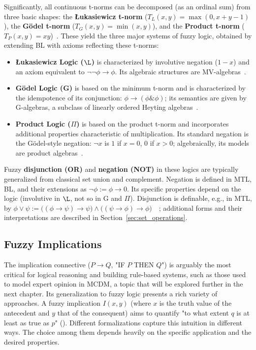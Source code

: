 Significantly, all continuous t-norms can be decomposed (as an ordinal sum) from three basic shapes: the \textbf{Łukasiewicz t-norm} ($T_L(x, y) = \max(0, x+y-1)$), the \textbf{Gödel t-norm} ($T_G(x, y) = \min(x, y)$), and the \textbf{Product t-norm} ($T_P(x, y) = x y$)~\cite[Thm. 2.1.16]{Hajek1998}. These yield the three major systems of fuzzy logic, obtained by extending BL with axioms reflecting these t-norms:
\begin{itemize}
    \item \textbf{Łukasiewicz Logic ($\L$)} is characterized by involutive negation ($1-x$) and an axiom equivalent to $\lnot\lnot\phi \rightarrow \phi$. Its algebraic structures are MV-algebras~\cite[Ch. 3]{Hajek1998}.
    \item \textbf{Gödel Logic (G)} is based on the minimum t-norm and is characterized by the idempotence of its conjunction: $\phi \rightarrow (\phi \& \phi)$; its semantics are given by G-algebras, a subclass of linearly ordered Heyting algebras~\cite[Sec. 4.2]{Hajek1998}.
    \item \textbf{Product Logic ($\Pi$)} is based on the product t-norm and incorporates additional properties characteristic of multiplication. Its standard negation is the Gödel-style negation: $\lnot x$ is $1$ if $x=0$, $0$ if $x>0$; algebraically, its models are product algebras~\cite[Sec. 4.1]{Hajek1998}.
\end{itemize}

Fuzzy \textbf{disjunction (OR)} and \textbf{negation (NOT)} in these logics are typically generalized from classical set union and complement. Negation is defined in MTL, BL, and their extensions as $\lnot \phi := \phi \rightarrow 0$. Its specific properties depend on the logic (involutive in $\L$, not so in G and $\Pi$). Disjunction is definable, e.g., in MTL, by $\phi \vee \psi := \big((\phi \rightarrow \psi) \rightarrow \psi\big) \wedge \big((\psi \rightarrow \phi) \rightarrow \phi\big)$~\cite[Def. 1]{GodoMonoidal}~\cite[Def. 2.2.1]{Hajek1998}; additional forms and their interpretations are described in Section~\ref{sec:set_operations}.

\subsection{Fuzzy Implications}

The implication connective ($P \rightarrow Q$, "IF $P$ THEN $Q$") is arguably the most critical for logical reasoning and building rule-based systems, such as those used to model expert opinion in MCDM, a topic that will be explored further in the next chapter. Its generalization to fuzzy logic presents a rich variety of approaches. A fuzzy implication $I(x,y)$ (where $x$ is the truth value of the antecedent and $y$ that of the consequent) aims to quantify "to what extent $q$ is at least as true as $p$" (\cite[p.57]{FULLER2}). Different formalizations capture this intuition in different ways. The choice among them depends heavily on the specific application and the desired properties.

